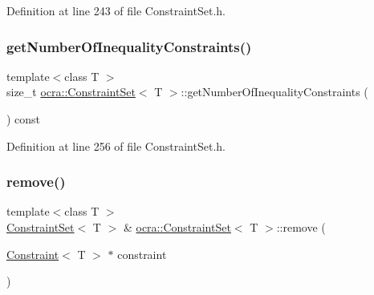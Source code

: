 Definition at line 243 of file Constraint\+Set.\+h.

\hypertarget{classocra_1_1ConstraintSet_ae8c7be6697c295e051550e225f6fe85b}{}\label{classocra_1_1ConstraintSet_ae8c7be6697c295e051550e225f6fe85b} 
\subsubsection{\texorpdfstring{get\+Number\+Of\+Inequality\+Constraints()}{getNumberOfInequalityConstraints()}}
{\footnotesize\ttfamily template$<$class T $>$ \\
size\+\_\+t \hyperlink{classocra_1_1ConstraintSet}{ocra\+::\+Constraint\+Set}$<$ T $>$\+::get\+Number\+Of\+Inequality\+Constraints (\begin{DoxyParamCaption}{ }\end{DoxyParamCaption}) const\hspace{0.3cm}{\ttfamily [inline]}}



Definition at line 256 of file Constraint\+Set.\+h.

\hypertarget{classocra_1_1ConstraintSet_a6f0c43b34ff1ea60911a10186c66f294}{}\label{classocra_1_1ConstraintSet_a6f0c43b34ff1ea60911a10186c66f294} 
\subsubsection{\texorpdfstring{remove()}{remove()}\hspace{0.1cm}{\footnotesize\ttfamily [1/2]}}
{\footnotesize\ttfamily template$<$class T $>$ \\
\hyperlink{classocra_1_1ConstraintSet}{Constraint\+Set}$<$ T $>$ \& \hyperlink{classocra_1_1ConstraintSet}{ocra\+::\+Constraint\+Set}$<$ T $>$\+::remove (\begin{DoxyParamCaption}\item[{\hyperlink{classocra_1_1Constraint}{Constraint}$<$ T $>$ $\ast$}]{constraint }\end{DoxyParamCaption})\hspace{0.3cm}{\ttfamily [inline]}}



